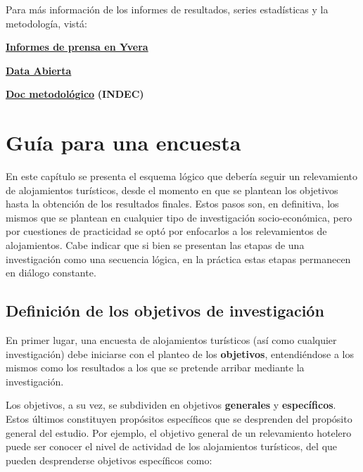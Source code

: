 \documentclass[
]{book}
\begin{document}
Para más información de los informes de resultados, series estadísticas y la metodología, vistá:

\href{https://www.yvera.tur.ar/estadistica/informe/info/encuesta-de-ocupacion-hotelera-eoh}{\textbf{Informes de prensa en Yvera}}

\href{http://datos.yvera.tur.ar/dataset/encuesta-ocupacion-hotelera-parahotelera-eoh}{\textbf{Data Abierta}}

\href{https://www.indec.gob.ar/ftp/cuadros/economia/eoh_aspectos_metodologicos.pdf}{\textbf{Doc metodológico}} \textbf{(INDEC)}

\hypertarget{guiaencuesta}{%
\chapter{\texorpdfstring{\textbf{Guía para una encuesta}}{Guía para una encuesta}}\label{guiaencuesta}}

En este capítulo se presenta el esquema lógico que debería seguir un relevamiento de alojamientos turísticos, desde el momento en que se plantean los objetivos hasta la obtención de los resultados finales. Estos pasos son, en definitiva, los mismos que se plantean en cualquier tipo de investigación socio-económica, pero por cuestiones de practicidad se optó por enfocarlos a los relevamientos de alojamientos. Cabe indicar que si bien se presentan las etapas de una investigación como una secuencia lógica, en la práctica estas etapas permanecen en diálogo constante.

\hypertarget{definiciuxf3n-de-los-objetivos-de-investigaciuxf3n}{%
\section{Definición de los objetivos de investigación}\label{definiciuxf3n-de-los-objetivos-de-investigaciuxf3n}}

En primer lugar, una encuesta de alojamientos turísticos (así como cualquier investigación) debe iniciarse con el planteo de los \textbf{objetivos}, entendiéndose a los mismos como los resultados a los que se pretende arribar mediante la investigación.

Los objetivos, a su vez, se subdividen en objetivos \textbf{generales} y \textbf{específicos}. Estos últimos constituyen propósitos específicos que se desprenden del propósito general del estudio. Por ejemplo, el objetivo general de un relevamiento hotelero puede ser conocer el nivel de actividad de los alojamientos turísticos, del que pueden desprenderse objetivos específicos como:
\end{document}
